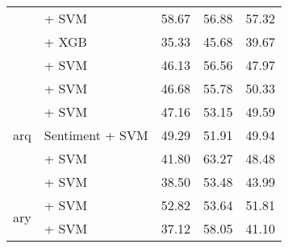 \begin{table*}[ht]
\begin{tabular}{@{}llp{1.1cm}p{1.1cm}p{1.1cm}@{}}
                                           & \citep{rasyosef2025llamaamharic} + SVM                             & 58.67                           & 56.88                              & 57.32                             \\
                                           & \citep{rasyosef2025robertaamharic} + XGB                           & 35.33                           & 45.68                              & 39.67                             \\
                                           & \citep{rasyosef2025robertaamharic} + SVM                           & 46.13                           & 56.56                              & 47.97                             \\
        \midrule
        \multirow{5}{*}{arq}               & \citep{arabert} + SVM                                              & 46.68                           & 55.78                              & 50.33                             \\
                                           & \citep{dziribert} + SVM                                            & 47.16                           & 53.15                              & 49.59                             \\
                                           & \citep{dziribert} Sentiment + SVM                                  & 49.29                           & 51.91                              & 49.94                             \\
                                           & \citep{wang2024multilingual} + SVM                                 & 41.80                           & 63.27                              & 48.48                             \\
                                           & \citep{nacar2025GATE} + SVM                                        & 38.50                           & 53.48                              & 43.99                             \\
        \midrule
        \multirow{4}{*}{ary}               & \citep{safaya-etal-2020-kuisail} + SVM                             & 52.82                           & 53.64                              & 51.81                             \\
                                           & \citep{gaanoun2023darijabert} + SVM                                & 37.12                           & 58.05                              & 41.10                             \\

\end{tabular}
\end{table*}
